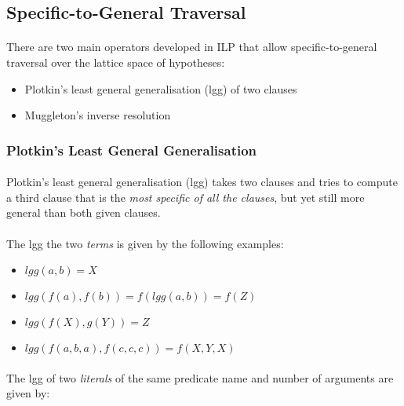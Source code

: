 \documentclass{article}
\theoremstyle{plain}
\theoremstyle{definition}
\begin{document}
\begin{multicols}{2}
\subsection{Specific-to-General Traversal}

\paragraph{} There are two main operators developed in ILP that allow specific-to-general traversal over the lattice space of hypotheses:

\begin{itemize}
\item Plotkin's least general generalisation (lgg) of two clauses
\item Muggleton's inverse resolution
\end{itemize}

\subsubsection{Plotkin's Least General Generalisation}

\paragraph{} Plotkin's least general generalisation (lgg)\cite{plotkin70} takes two clauses and tries to compute a third clause that is the \textit{most specific of all the clauses}, but yet still more general than both given clauses.

\paragraph{} The lgg the two \textit{terms} is given by the following examples:

\begin{itemize}
\item $lgg(a, b) = X$
\item $lgg(f(a), f(b)) = f(lgg(a, b)) = f(Z)$
\item $lgg(f(X), g(Y)) = Z$
\item $lgg(f(a, b, a), f(c, c, c)) = f(X, Y, X)$
\end{itemize}

\paragraph{} The lgg of two \textit{literals} of the same predicate name and number of arguments are given by:


\end{multicols}
\end{document}
